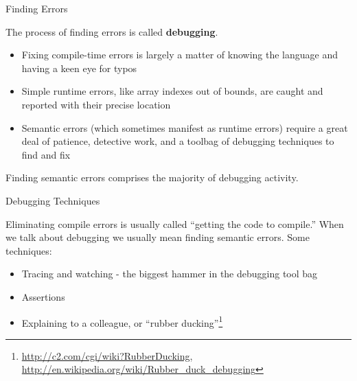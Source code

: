 \documentclass{beamer}
\begin{document}
\begin{frame}[fragile]{Finding Errors}


The process of finding errors is called {\bf debugging}.

\begin{itemize}
\item Fixing compile-time errors is largely a matter of knowing the language and having a keen eye for typos
\item Simple runtime errors, like array indexes out of bounds, are caught and reported with their precise location
\item Semantic errors (which sometimes manifest as runtime errors) require a great deal of patience, detective work, and a toolbag of debugging techniques to find and fix
\end{itemize}

Finding semantic errors comprises the majority of debugging activity.

\end{frame}


\begin{frame}[fragile]{Debugging Techniques}


Eliminating compile errors is usually called ``getting the code to compile.''  When we talk about debugging we usually mean finding semantic errors.  Some techniques:
\begin{itemize}
\item Tracing and watching - the biggest hammer in the debugging tool bag
\item Assertions
\item Explaining to a colleague, or ``rubber ducking''\footnote{\url{http://c2.com/cgi/wiki?RubberDucking}, \url{http://en.wikipedia.org/wiki/Rubber_duck_debugging}}
\end{itemize}

\end{frame}
\end{document}
